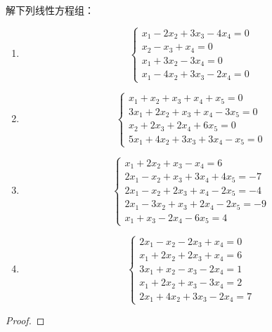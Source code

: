 \begin{problem}\label{problem-2.2}
解下列线性方程组：
\begin{enumerate}
    \item \begin{equation*}
              \begin{cases}
                  x_1-2x_2+3x_3-4x_4=0 \\
                  x_2-x_3+x_4=0        \\
                  x_1+3x_2-3x_4=0      \\
                  x_1-4x_2+3x_3-2x_4=0
              \end{cases}
          \end{equation*}
    \item \begin{equation*}
              \begin{cases}
                  x_1+x_2+x_3+x_4+x_5=0    \\
                  3x_1+2x_2+x_3+x_4-3x_5=0 \\
                  x_2+2x_3+2x_4+6x_5=0     \\
                  5x_1+4x_2+3x_3+3x_4-x_5=0
              \end{cases}
          \end{equation*}
    \item \begin{equation*}
              \begin{cases}
                  x_1+2x_2+x_3-x_4=6         \\
                  2x_1-x_2+x_3+3x_4+4x_5=-7  \\
                  2x_1-x_2+2x_3+x_4-2x_5=-4  \\
                  2x_1-3x_2+x_3+2x_4-2x_5=-9 \\
                  x_1+x_3-2x_4-6x_5=4
              \end{cases}
          \end{equation*}
    \item \begin{equation*}
              \begin{cases}
                  2x_1-x_2-2x_3+x_4=0 \\
                  x_1+2x_2+2x_3+x_4=6 \\
                  3x_1+x_2-x_3-2x_4=1 \\
                  x_1+2x_2+x_3-3x_4=2 \\
                  2x_1+4x_2+3x_3-2x_4=7
              \end{cases}
          \end{equation*}
\end{enumerate}
\end{problem}
\begin{proof}
\end{proof}

